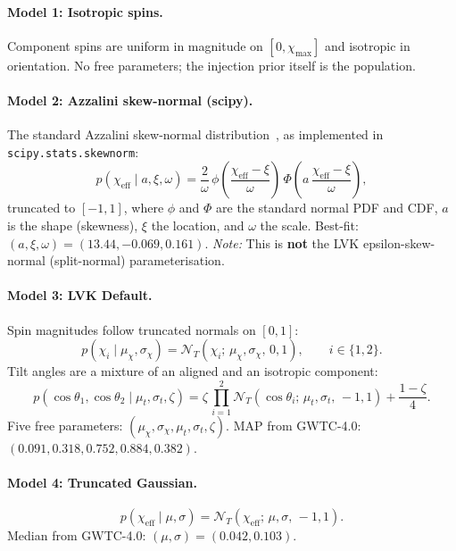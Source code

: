 \documentclass[11pt,a4paper]{article}
\newcommand{\chieff}{\ensuremath{\chi_\mathrm{eff}}\xspace}
\begin{document}
\paragraph{Model 1: Isotropic spins.}
Component spins are uniform in magnitude on $[0,\chi_\mathrm{max}]$ and
isotropic in orientation. No free parameters; the injection prior itself
is the population.

\paragraph{Model 2: Azzalini skew-normal (scipy).}
The standard Azzalini skew-normal distribution~\citep{Azzalini1985},
as implemented in \texttt{scipy.stats.skewnorm}:
\begin{equation}
  p(\chieff \mid a,\xi,\omega) = \frac{2}{\omega}\,
  \phi\!\left(\frac{\chieff - \xi}{\omega}\right)\,
  \Phi\!\left(a\,\frac{\chieff - \xi}{\omega}\right),
\end{equation}
truncated to $[-1,1]$, where $\phi$ and $\Phi$ are the standard normal
PDF and CDF, $a$ is the shape (skewness), $\xi$ the location, and
$\omega$ the scale.
Best-fit: $(a,\xi,\omega) = (13.44, -0.069, 0.161)$.
\emph{Note:} This is \textbf{not} the LVK epsilon-skew-normal
(split-normal) parameterisation.

\paragraph{Model 3: LVK Default.}
Spin magnitudes follow truncated normals on $[0,1]$:
\begin{equation}
  p(\chi_i \mid \mu_\chi,\sigma_\chi) = \mathcal{N}_T(\chi_i;\,\mu_\chi,\sigma_\chi,\,0,1),
  \qquad i \in \{1,2\}.
\end{equation}
Tilt angles are a mixture of an aligned and an isotropic component:
\begin{equation}
  p(\cos\theta_1,\cos\theta_2 \mid \mu_t,\sigma_t,\zeta)
  = \zeta\,\prod_{i=1}^{2}\mathcal{N}_T(\cos\theta_i;\,\mu_t,\sigma_t,\,-1,1)
  + \frac{1-\zeta}{4}.
\end{equation}
Five free parameters: $(\mu_\chi,\sigma_\chi,\mu_t,\sigma_t,\zeta)$.
MAP from GWTC-4.0: $(0.091, 0.318, 0.752, 0.884, 0.382)$.

\paragraph{Model 4: Truncated Gaussian.}
\begin{equation}
  p(\chieff \mid \mu,\sigma) = \mathcal{N}_T(\chieff;\,\mu,\sigma,\,-1,1).
\end{equation}
Median from GWTC-4.0: $(\mu,\sigma) = (0.042, 0.103)$.
\end{document}
